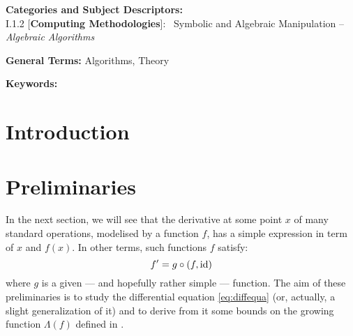 \documentclass{sig-alternate}
\begin{document}
\vspace{1mm}
 \noindent
 {\bf Categories and Subject Descriptors:} \\
\noindent I.1.2 [{\bf Computing Methodologies}]:{~} Symbolic and Algebraic
  Manipulation -- \emph{Algebraic Algorithms}

 \vspace{1mm}
 \noindent
 {\bf General Terms:} Algorithms, Theory

 \vspace{1mm}
 \noindent
 {\bf Keywords:} 
\medskip

\section{Introduction}

\section{Preliminaries}

In the next section, we will see that the derivative at some point $x$ 
of many standard operations, modelised by a function $f$, has a simple 
expression in term of $x$ and $f(x)$. In other terms, such functions $f$
satisfy:
\begin{equation}
\label{eq:diffequa}
f' = g \circ (f, \textrm{id})
\end{equation}
where $g$ is a given --- and hopefully rather simple --- function. 
The aim of these preliminaries is to study the differential equation
\eqref{eq:diffequa} (or, actually, a slight generalization of it) and
to derive from it some bounds on the growing function $\Lambda(f)$ 
defined in \cite{padicprec}.
\end{document}
